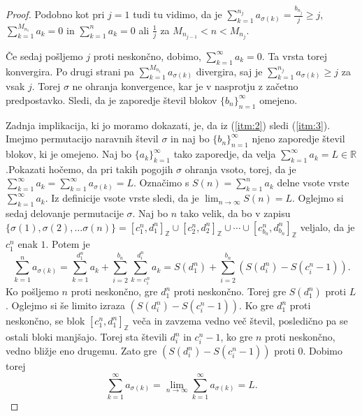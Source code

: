\documentclass[12pt,a4paper,reqno]{amsart}
\theoremstyle{definition} %
\theoremstyle{plain} %
\newcommand{\R}{\mathbb R}
\newcommand{\Z}{\mathbb Z}
\begin{document}
\begin{proof}
Podobno kot pri $j=1$ tudi tu vidimo, da je $\sum_{k=1}^{n_j}a_{\sigma(k)}=\frac{b_{n_j}}{j}\geq j$, $\sum_{k=1}^{M_{n_1}}a_k=0$ in $\sum_{k=1}^{n}a_k=0$ ali $\frac{1}{j}$ za $M_{n_{j-1}}<n<M_{n_j}$.%

Če sedaj pošljemo $j$ proti neskončno, dobimo, $\sum_{k=1}^{\infty}a_k=0$. Ta vrsta torej konvergira. Po drugi strani pa $\sum_{k=1}^{M_{n_1}}a_{\sigma(k)}$ divergira, saj je $\sum_{k=1}^{n_j}a_{\sigma(k)}\geq j$ za vsak $j$. Torej $\sigma$ ne ohranja konvergence, kar je v nasprotju z začetno predpostavko. Sledi, da je zaporedje števil blokov $\{b_n\}^{\infty}_{n=1}$ omejeno.

Zadnja implikacija, ki jo moramo dokazati, je, da iz (\ref{itm:2}) sledi (\ref{itm:3}).
Imejmo permutacijo naravnih števil $\sigma$ in naj bo $\{b_n\}_{n=1}^{\infty}$ njeno zaporedje števil blokov, ki je omejeno. Naj bo $\{a_k\}_{k=1}^{\infty}$ tako zaporedje, da velja $\sum_{k=1}^{\infty}a_k=L\in \R$.Pokazati hočemo, da pri takih pogojih $\sigma$ ohranja vsoto, torej, da je $\sum_{k=1}^{\infty}a_k=\sum_{k=1}^{\infty}a_{\sigma(k)}=L$. 
Označimo s $S(n)=\sum_{k=1}^{n}a_k$ delne vsote vrste $\sum_{k=1}^{\infty}a_k$. Iz definicije vsote vrste sledi, da je $\lim_{n\to \infty}S(n)=L$. Oglejmo si sedaj delovanje permutacije $\sigma$. Naj bo $n$ tako velik, da bo v zapisu $\{ \sigma (1), \sigma (2), \ldots \sigma (n) \} = [c^n_1, d^n_1]_{\Z} \cup [c^n_2, d^n_2]_{\Z} \cup \cdots \cup [c^n_{b_n}, d^n_{b_n}]_{\Z}$ veljalo, da je $c^n_1$ enak $1$. Potem je 
\begin{equation} \label{eq:5}
\sum_{k=1}^{n}a_{\sigma(k)}=\sum_{k=1}^{d_1^n}a_k+\sum_{i=2}^{b_n}\sum_{k=c_i^n}^{d_i^n}a_k = S(d_1^n)+\sum_{i=2}^{b_n}(S(d_i^n)-S(c_i^n-1)).
\end{equation}
Ko pošljemo $n$ proti neskončno, gre $d_1^n$ proti neskončno. Torej gre $S(d_1^n)$ proti $L$. Oglejmo si še limito izraza $(S(d_i^n)-S(c_i^n-1))$. Ko gre $d_1^n$ proti neskončno, se blok  $[c^n_1, d^n_1]_{\Z}$ veča in zavzema vedno več števil, posledično pa se ostali bloki manjšajo. Torej sta števili $d_i^n$ in $c_i^n-1$, ko gre $n$ proti neskončno, vedno bližje eno drugemu. Zato gre $(S(d_i^n)-S(c_i^n-1))$ proti $0$. Dobimo torej $$\sum_{k=1}^{\infty}a_{\sigma(k)}=\lim_{n \to \infty}\sum_{k=1}^{\infty}a_{\sigma(k)}=L.$$
\end{proof}
\end{document}
